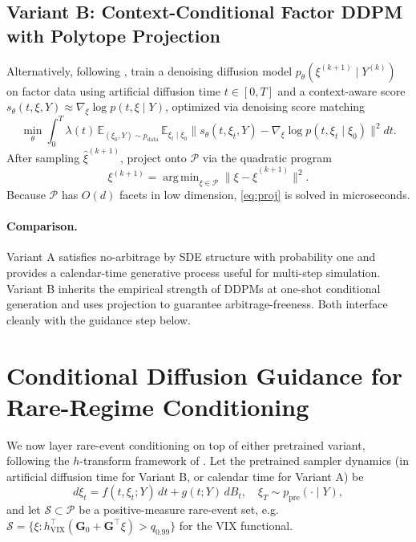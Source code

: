 \documentclass{article}
\DeclareMathOperator*{\argmin}{arg\,min}
\newcommand{\E}{\mathbb{E}}
\newcommand{\1}{\mathbf{1}}
\newcommand{\cP}{\mathcal{P}}
\newcommand{\cS}{\mathcal{S}}
\begin{document}
\subsection{Variant B: Context-Conditional Factor DDPM with Polytope Projection}
\label{sec:ddpm}

Alternatively, following \citet{jin2026}, train a denoising diffusion model $p_\theta(\xi^{(k+1)} \mid Y^{(k)})$ on factor data using artificial diffusion time $t \in [0, T]$ and a context-aware score $s_\theta(t, \xi, Y) \approx \nabla_\xi \log p(t, \xi \mid Y)$, optimized via denoising score matching
\begin{equation}
\min_\theta \int_0^T \lambda(t)\, \E_{(\xi_0, Y) \sim p_{\text{data}}}\, \E_{\xi_t \mid \xi_0} \bigl\| s_\theta(t, \xi_t, Y) - \nabla_\xi \log p(t, \xi_t \mid \xi_0) \bigr\|^2 dt.
\label{eq:dsm}
\end{equation}
After sampling $\hat\xi^{(k+1)}$, project onto $\cP$ via the quadratic program
\begin{equation}
\xi^{(k+1)} = \argmin_{\xi \in \cP} \| \xi - \hat\xi^{(k+1)} \|^2.
\label{eq:proj}
\end{equation}
Because $\cP$ has $O(d)$ facets in low dimension, \eqref{eq:proj} is solved in microseconds.

\paragraph{Comparison.} Variant A satisfies no-arbitrage by SDE structure with probability one and provides a calendar-time generative process useful for multi-step simulation. Variant B inherits the empirical strength of DDPMs at one-shot conditional generation and uses projection to guarantee arbitrage-freeness. Both interface cleanly with the guidance step below.

\section{Conditional Diffusion Guidance for Rare-Regime Conditioning}
\label{sec:cdg}

We now layer rare-event conditioning on top of either pretrained variant, following the $h$-transform framework of \citet{guo2026}. Let the pretrained sampler dynamics (in artificial diffusion time for Variant B, or calendar time for Variant A) be
\begin{equation}
d\xi_t = f(t, \xi_t; Y)\, dt + g(t; Y)\, dB_t, \quad \xi_T \sim p_{\text{pre}}(\cdot \mid Y),
\label{eq:basesde}
\end{equation}
and let $\cS \subset \cP$ be a positive-measure rare-event set, e.g.\ $\cS = \{\xi : h_{\mathrm{VIX}}^\top (\mathbf{G}_0 + \mathbf{G}^\top \xi) > q_{0.99}\}$ for the VIX functional.
\end{document}

